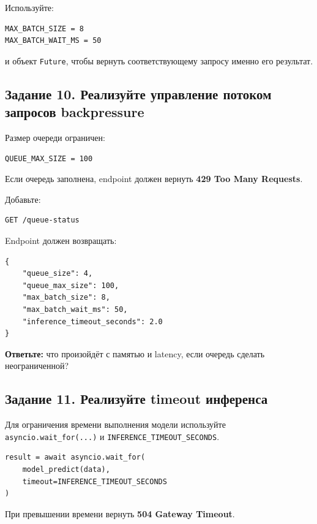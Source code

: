 \documentclass[12pt,a4paper]{article}
\begin{document}
Используйте:

\begin{lstlisting}[caption={Параметры dynamic batching}]
MAX_BATCH_SIZE = 8
MAX_BATCH_WAIT_MS = 50
\end{lstlisting}

и объект \texttt{Future}, чтобы вернуть соответствующему запросу именно его результат.

\subsection{Задание 10. Реализуйте управление потоком запросов backpressure}

Размер очереди ограничен:

\begin{lstlisting}[caption={Ограничение очереди}]
QUEUE_MAX_SIZE = 100
\end{lstlisting}

Если очередь заполнена, endpoint должен вернуть \textbf{429 Too Many Requests}.

Добавьте:

\begin{lstlisting}[caption={Endpoint /queue-status}]
GET /queue-status
\end{lstlisting}

Endpoint должен возвращать:

\begin{lstlisting}[caption={Ответ /queue-status}]
{
    "queue_size": 4,
    "queue_max_size": 100,
    "max_batch_size": 8,
    "max_batch_wait_ms": 50,
    "inference_timeout_seconds": 2.0
}
\end{lstlisting}

\textbf{Ответьте:} что произойдёт с памятью и latency, если очередь сделать неограниченной?

\subsection{Задание 11. Реализуйте timeout инференса}

Для ограничения времени выполнения модели используйте \texttt{asyncio.wait\_for(...)} и \texttt{INFERENCE\_TIMEOUT\_SECONDS}.

\begin{lstlisting}[caption={Таймаут инференса}]
result = await asyncio.wait_for(
    model_predict(data),
    timeout=INFERENCE_TIMEOUT_SECONDS
)
\end{lstlisting}

При превышении времени вернуть \textbf{504 Gateway Timeout}.
\end{document}
